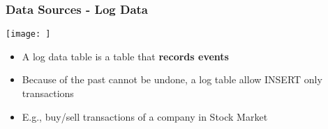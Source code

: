 \subsubsection{Data Sources - Log Data}

\begin{center}
\texttt{[image: ]}
\end{center}

\begin{itemize}
	\item A log data table is a table that \textbf{records events}
	\item Because of the past cannot be undone, a log table allow INSERT only transactions
	\item E.g., buy/sell transactions of a company in Stock Market
\end{itemize}


